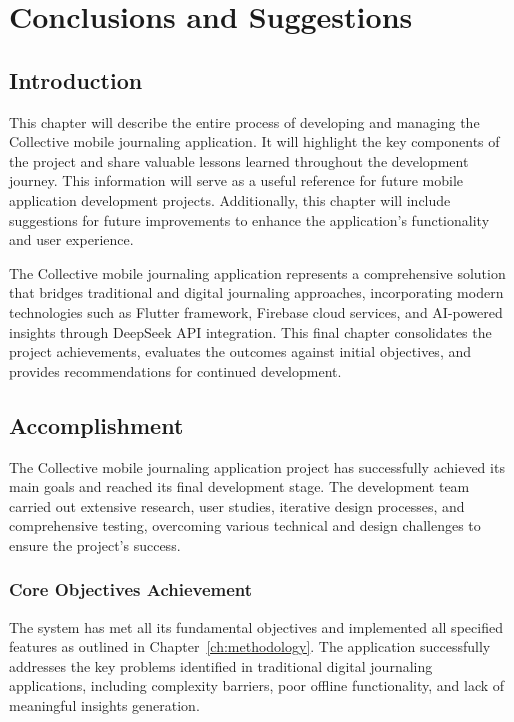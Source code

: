 \chapter{Conclusions and Suggestions}\label{ch:conclusions}

\section{Introduction}\label{sec:conclusionsIntroduction}

This chapter will describe the entire process of developing and managing the Collective mobile journaling application. It will highlight the key components of the project and share valuable lessons learned throughout the development journey. This information will serve as a useful reference for future mobile application development projects. Additionally, this chapter will include suggestions for future improvements to enhance the application's functionality and user experience.

The Collective mobile journaling application represents a comprehensive solution that bridges traditional and digital journaling approaches, incorporating modern technologies such as Flutter framework, Firebase cloud services, and AI-powered insights through DeepSeek API integration. This final chapter consolidates the project achievements, evaluates the outcomes against initial objectives, and provides recommendations for continued development.

\section{Accomplishment}\label{sec:accomplishment}

The Collective mobile journaling application project has successfully achieved its main goals and reached its final development stage. The development team carried out extensive research, user studies, iterative design processes, and comprehensive testing, overcoming various technical and design challenges to ensure the project's success.

\subsection{Core Objectives Achievement}

The system has met all its fundamental objectives and implemented all specified features as outlined in Chapter~\ref{ch:methodology}. The application successfully addresses the key problems identified in traditional digital journaling applications, including complexity barriers, poor offline functionality, and lack of meaningful insights generation.

